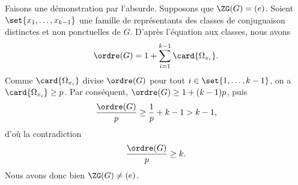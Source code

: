 Faisons une démonstration par l'absurde.
Supposons que $\ZG(G) = (e)$.
Soient $\set{x_1,\dots,x_{k - 1}}$ une famille de représentants des classes de conjuguaison distinctes et non ponctuelles de $G$.
D'après l'équation aux classes, nous avons
\[
  \ordre(G) = 1 + \sum_{i = 1}^{k - 1} \card{\Omega_{x_i}}.
\]
Comme $\card{\Omega_{x_i}}$ divise $\ordre(G)$ pour tout $i\in\set{1,\dots,k - 1}$, on a $\card{\Omega_{x_i}} \geq p$.
Par conséquent, $\ordre(G) \geq 1 + (k - 1)p$, puis
\[
  \frac{\ordre(G)}{p} \geq \frac{1}{p} + k - 1 > k - 1,
\]
d'où la contradiction
\[
  \frac{\ordre(G)}{p} \geq k.
\]
Nous avons donc bien $\ZG(G) \neq (e)$.
